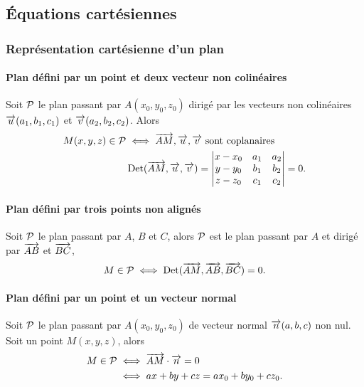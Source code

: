 \subsection{Équations cartésiennes}

\subsubsection{Représentation cartésienne d'un plan}

\paragraph{Plan défini par un point et deux vecteur non colinéaires}

Soit \(\P\) le plan passant par \(A(x_0, y_0, z_0)\) dirigé par les vecteurs
non colinéaires \(\vu(a_1, b_1, c_1)\) et \(\vv(a_2, b_2, c_2)\). Alors
\begin{align}
  M(x, y, z) \in \P &\iff \vect{AM}, \vu, \vv \text{~sont coplanaires}\\
                    &\Det(\vect{AM},\vu, \vv) = \begin{vmatrix} x - x_0 & a_1
                      & a_2 \\ y - y_0 & b_1 & b_2 \\ z - z_0 & c_1 & c_2
                    \end{vmatrix} = 0.
\end{align}

\paragraph{Plan défini par trois points non alignés}

Soit \(\P\) le plan passant par \(A\), \(B\) et \(C\), alors \(\P\) est le
plan passant par \(A\) et dirigé par \(\vect{AB}\) et \(\vect{BC}\),
\begin{equation}
  M \in \P \iff \Det(\vect{AM}, \vect{AB}, \vect{BC}) = 0.
\end{equation}

\paragraph{Plan défini par un point et un vecteur normal}

Soit \(\P\) le plan passant par \(A(x_0, y_0, z_0)\) de vecteur normal
\(\vect{n}(a, b, c)\) non nul. Soit un point \(M(x, y, z)\), alors
\begin{align}
  M \in \P &\iff \vect{AM}\cdot\vect{n} = 0 \\
           &\iff ax + by + cz = ax_0 + by_0 + cz_0.
\end{align}

